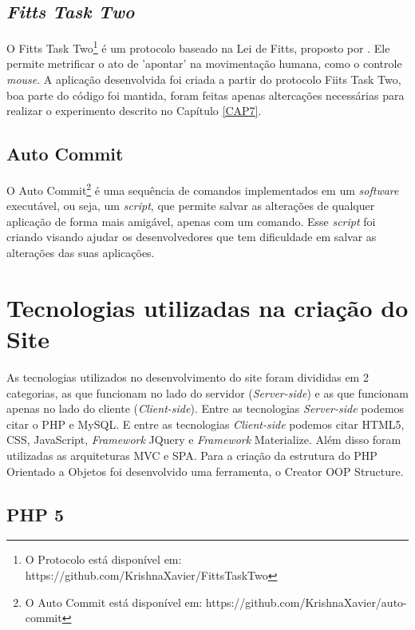 \subsection{\textit{Fitts Task Two}}

O Fitts Task Two\footnote{O Protocolo está disponível em: https://github.com/KrishnaXavier/FittsTaskTwo} é um protocolo baseado na Lei de Fitts, proposto por . Ele permite metrificar o ato de 'apontar' na movimentação humana, como o controle \textit{mouse}. A aplicação desenvolvida foi criada a partir do protocolo Fiits Task Two, boa parte do código foi mantida, foram feitas apenas altercações necessárias para realizar o experimento descrito no Capítulo \ref{CAP7}.

\subsection{Auto Commit}

O Auto Commit\footnote{O Auto Commit está disponível em: https://github.com/KrishnaXavier/auto-commit} é uma sequência de comandos implementados em um \textit{software} executável, ou seja, um \textit{script}, que permite salvar as alterações de qualquer aplicação de forma mais amigável, apenas com um comando. Esse \textit{script} foi criando visando ajudar os desenvolvedores que tem dificuldade em salvar as alterações das suas aplicações.



\section{Tecnologias utilizadas na criação do Site}\label{Sub:tecnologias-site}
As tecnologias utilizados no desenvolvimento do site foram divididas em 2 categorias, as que funcionam no lado do servidor (\textit{Server-side}) e as que funcionam apenas no lado do cliente (\textit{Client-side}). Entre as tecnologias \textit{Server-side} podemos citar o PHP e MySQL. E entre as tecnologias \textit{Client-side} podemos citar HTML5, CSS, JavaScript, \textit{Framework }JQuery e \textit{Framework} Materialize. Além disso foram utilizadas as arquiteturas MVC e SPA. Para a criação da estrutura do PHP Orientado a Objetos foi desenvolvido uma ferramenta, o Creator OOP Structure.

\subsection{PHP 5}

